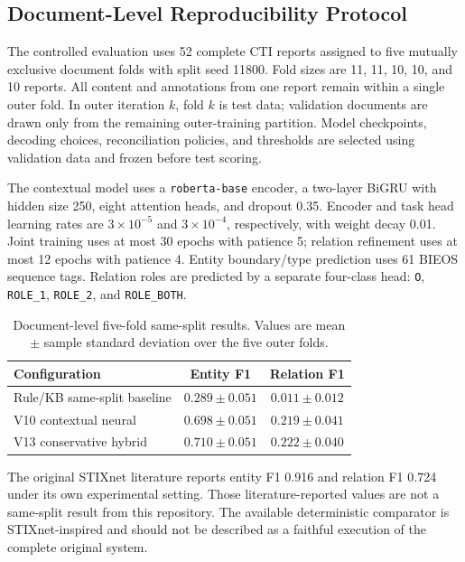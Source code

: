 \subsection{Document-Level Reproducibility Protocol}
The controlled evaluation uses 52 complete CTI reports assigned to five
mutually exclusive document folds with split seed 11800. Fold sizes are 11,
11, 10, 10, and 10 reports. All content and annotations from one report remain
within a single outer fold. In outer iteration $k$, fold $k$ is test data;
validation documents are drawn only from the remaining outer-training
partition. Model checkpoints, decoding choices, reconciliation policies, and
thresholds are selected using validation data and frozen before test scoring.

The contextual model uses a \texttt{roberta-base} encoder, a two-layer BiGRU
with hidden size 250, eight attention heads, and dropout 0.35. Encoder and task
head learning rates are $3\times10^{-5}$ and $3\times10^{-4}$, respectively,
with weight decay 0.01. Joint training uses at most 30 epochs with patience 5;
relation refinement uses at most 12 epochs with patience 4. Entity
boundary/type prediction uses 61 BIEOS sequence tags. Relation roles are
predicted by a separate four-class head: \texttt{O}, \texttt{ROLE\_1},
\texttt{ROLE\_2}, and \texttt{ROLE\_BOTH}.

\begin{table}[t]
\centering
\caption{Document-level five-fold same-split results. Values are mean $\pm$
sample standard deviation over the five outer folds.}
\label{tab:document-cv}
\begin{tabular}{lcc}
\hline
Configuration & Entity F1 & Relation F1 \\
\hline
Rule/KB same-split baseline & $0.289\pm0.051$ & $0.011\pm0.012$ \\
V10 contextual neural & $0.698\pm0.051$ & $0.219\pm0.041$ \\
V13 conservative hybrid & $0.710\pm0.051$ & $0.222\pm0.040$ \\
\hline
\end{tabular}
\end{table}

The original STIXnet literature reports entity F1 0.916 and relation F1 0.724
under its own experimental setting. Those literature-reported values are not a
same-split result from this repository. The available deterministic comparator
is STIXnet-inspired and should not be described as a faithful execution of the
complete original system.
